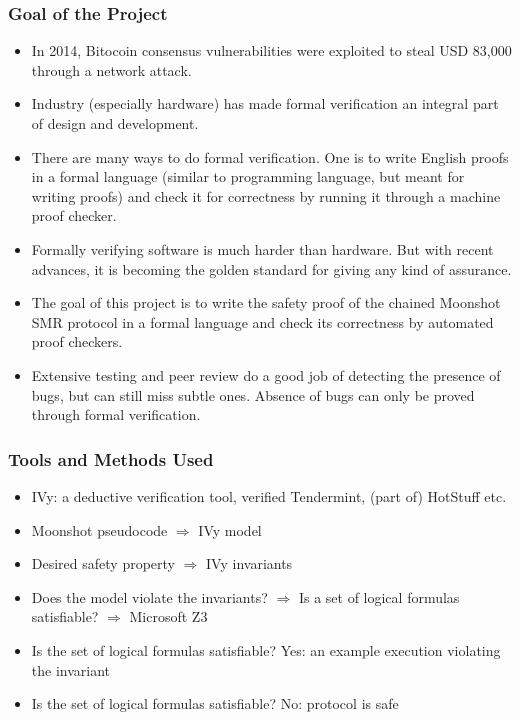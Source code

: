 \documentclass{beamer}
\begin{document}
\begin{frame}
\frametitle{Goal of the Project}
\begin{itemize}
        \item In 2014, Bitocoin consensus vulnerabilities were
            exploited to steal USD 83,000 through a network attack.
            \pause
            \vfill
        \item Industry (especially hardware) has made formal verification an integral part of design and development.
        \pause
        \vfill
        \item There are many ways to do formal verification. One is to write English proofs in a formal language (similar to programming language, but meant for writing proofs) and check it for correctness by running it through a machine proof checker.
        \pause
        \vfill
        \item Formally verifying software is much harder than hardware. But with recent advances, it is becoming the golden standard for giving any kind of assurance.
        \pause
        \vfill
        \item The goal of this project is to write the safety proof of the chained Moonshot SMR protocol in a formal language and check its correctness by automated proof checkers.
        \pause
        \vfill
        \item Extensive testing and peer review do a good job of
            detecting the presence of bugs, but can still miss subtle
            ones. Absence of bugs can only be proved through formal verification.
    \end{itemize}
\end{frame}

\begin{frame}
    \frametitle{Tools and Methods Used}
    \begin{itemize}
        \item \alert{IVy}: a deductive
            verification tool, verified Tendermint, (part of) HotStuff etc.
            \pause
            \vfill
        \item Moonshot pseudocode $\Rightarrow$ IVy model
            \pause
            \vfill
        \item Desired safety property $\Rightarrow$ IVy invariants
            \pause
            \vfill
        \item Does the model violate the invariants? $\Rightarrow$ Is a set of
            logical formulas satisfiable? \pause $\Rightarrow$ Microsoft Z3
            \pause
            \vfill
        \item Is the set of logical formulas satisfiable? \alert{Yes}:
            an example execution violating the invariant
            \pause
            \vfill
        \item Is the set of logical formulas satisfiable? \alert{No}:
            protocol is safe
    \end{itemize}
\end{frame}
\end{document}

